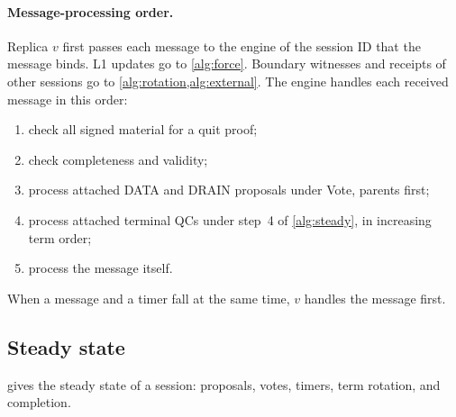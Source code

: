 \documentclass[11pt,a4paper]{article}
\newcommand{\RR}[1]{{\color{rrRed}#1}}
\begin{document}
\paragraph{Message-processing order.}\leavevmode
\RR{Replica $v$ first passes each message to the engine of the session
ID that the message binds. L1 updates go to \cref{alg:force}. Boundary witnesses and receipts of
other sessions go to \cref{alg:rotation,alg:external}.} The engine handles each received
message in this order:
\begin{enumerate}[label=(\arabic*)]
\item check all signed material for a quit proof;
\item check completeness and validity;
\item process attached DATA \RR{and DRAIN} proposals under Vote, parents
first;
\item process attached terminal QCs under step~4 of \cref{alg:steady},
in increasing term order;
\item process the message itself.
\end{enumerate}
When a message and a timer fall at the same time, $v$ handles the
message first.

\subsection{Steady state}
\label{sec:steady}
 gives the steady state of a session: proposals, votes,
timers, term rotation, and completion.
\end{document}
